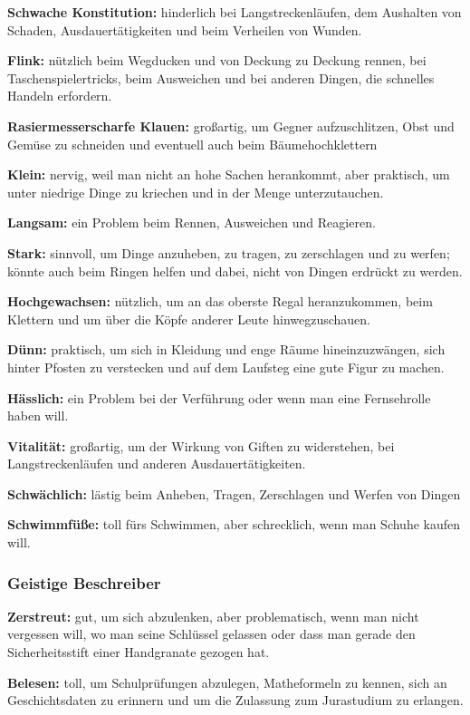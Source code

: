 \documentclass[]{article}
\begin{document}
\textbf{Schwache Konstitution:} hinderlich bei Langstreckenläufen, dem
Aushalten von Schaden, Ausdauertätigkeiten und beim Verheilen von
Wunden.

\textbf{Flink:} nützlich beim Wegducken und von Deckung zu Deckung
rennen, bei Taschenspielertricks, beim Ausweichen und bei anderen
Dingen, die schnelles Handeln erfordern.

\textbf{Rasiermesserscharfe Klauen:} großartig, um Gegner
aufzuschlitzen, Obst und Gemüse zu schneiden und eventuell auch beim
Bäumehochklettern

\textbf{Klein:} nervig, weil man nicht an hohe Sachen herankommt, aber
praktisch, um unter niedrige Dinge zu kriechen und in der Menge
unterzutauchen.

\textbf{Langsam:} ein Problem beim Rennen, Ausweichen und Reagieren.

\textbf{Stark:} sinnvoll, um Dinge anzuheben, zu tragen, zu zerschlagen
und zu werfen; könnte auch beim Ringen helfen und dabei, nicht von
Dingen erdrückt zu werden.

\textbf{Hochgewachsen:} nützlich, um an das oberste Regal heranzukommen,
beim Klettern und um über die Köpfe anderer Leute hinwegzuschauen.

\textbf{Dünn:} praktisch, um sich in Kleidung und enge Räume
hineinzuzwängen, sich hinter Pfosten zu verstecken und auf dem Laufsteg
eine gute Figur zu machen.

\textbf{Hässlich:} ein Problem bei der Verführung oder wenn man eine
Fernsehrolle haben will.

\textbf{Vitalität:} großartig, um der Wirkung von Giften zu widerstehen,
bei Langstreckenläufen und anderen Ausdauertätigkeiten.

\textbf{Schwächlich:} lästig beim Anheben, Tragen, Zerschlagen und
Werfen von Dingen

\textbf{Schwimmfüße:} toll fürs Schwimmen, aber schrecklich, wenn man
Schuhe kaufen will.

\subsubsection{Geistige Beschreiber}\label{geistige-beschreiber}

\textbf{Zerstreut:} gut, um sich abzulenken, aber problematisch, wenn
man nicht vergessen will, wo man seine Schlüssel gelassen oder dass man
gerade den Sicherheitsstift einer Handgranate gezogen hat.

\textbf{Belesen:} toll, um Schulprüfungen abzulegen, Matheformeln zu
kennen, sich an Geschichtsdaten zu erinnern und um die Zulassung zum
Jurastudium zu erlangen.
\end{document}
